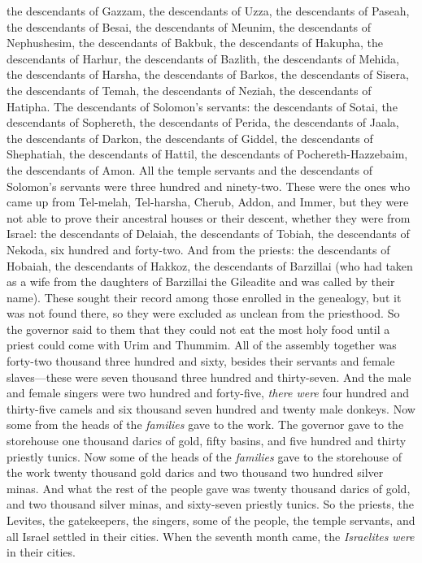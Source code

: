 \begin{biblechapter}
\verse the descendants of Gazzam, the descendants of Uzza, the descendants of Paseah,
\verse the descendants of Besai, the descendants of Meunim, the descendants of Nephushesim,
\verse the descendants of Bakbuk, the descendants of Hakupha, the descendants of Harhur,
\verse the descendants of Bazlith, the descendants of Mehida, the descendants of Harsha,
\verse the descendants of Barkos, the descendants of Sisera, the descendants of Temah,
\verse the descendants of Neziah, the descendants of Hatipha.
\verse The descendants of Solomon’s servants: the descendants of Sotai, the descendants of Sophereth, the descendants of Perida,
\verse the descendants of Jaala, the descendants of Darkon, the descendants of Giddel,
\verse the descendants of Shephatiah, the descendants of Hattil, the descendants of Pochereth-Hazzebaim, the descendants of Amon.
\verse All the temple servants and the descendants of Solomon’s servants were three hundred and ninety-two.
\verse These were the ones who came up from Tel-melah, Tel-harsha, Cherub, Addon, and Immer, but they were not able to prove their ancestral houses or their descent, whether they were from Israel:
\verse the descendants of Delaiah, the descendants of Tobiah, the descendants of Nekoda, six hundred and forty-two.
\verse And from the priests: the descendants of Hobaiah, the descendants of Hakkoz, the descendants of Barzillai (who had taken as a wife from the daughters of Barzillai the Gileadite and was called by their name).
\verse These sought their record among those enrolled in the genealogy, but it was not found there, so they were excluded as unclean from the priesthood.
\verse So the governor said to them that they could not eat the most holy food until a priest could come with Urim and Thummim.
\verse All of the assembly together was forty-two thousand three hundred and sixty,
\verse besides their servants and female slaves—these were seven thousand three hundred and thirty-seven. And the male and female singers were two hundred and forty-five,
\verse  \textit{there were} four hundred and thirty-five camels and six thousand seven hundred and twenty male donkeys.
\verse Now some from the heads of the \textit{families} gave to the work. The governor gave to the storehouse one thousand darics of gold, fifty basins, and five hundred and thirty priestly tunics.
\verse Now some of the heads of the \textit{families} gave to the storehouse of the work twenty thousand gold darics and two thousand two hundred silver minas.
\verse And what the rest of the people gave was twenty thousand darics of gold, and two thousand silver minas, and sixty-seven priestly tunics.
\verse So the priests, the Levites, the gatekeepers, the singers, some of the people, the temple servants, and all Israel settled in their cities. When the seventh month came, the \textit{Israelites} \textit{were} in their cities.
\end{biblechapter}

